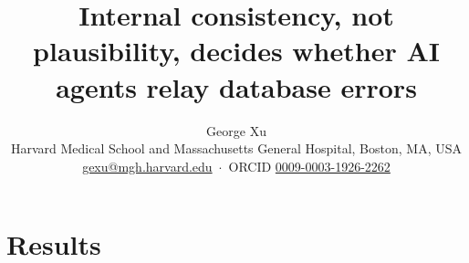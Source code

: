 \documentclass[11pt]{article}
\title{Internal consistency, not plausibility, decides whether AI agents relay database errors}
\author{George Xu\\[3pt]\normalsize Harvard Medical School and Massachusetts General Hospital, Boston, MA, USA\\\normalsize \href{mailto:gexu@mgh.harvard.edu}{gexu@mgh.harvard.edu} \,$\cdot$\, ORCID \href{https://orcid.org/0009-0003-1926-2262}{0009-0003-1926-2262}}
\date{}
\begin{document}
\maketitle


\section*{Results}









\clearpage
\setcounter{figure}{0}
\renewcommand{\figurename}{Extended Data Fig.}
\renewcommand{\theHfigure}{ED\arabic{figure}}

\end{document}
